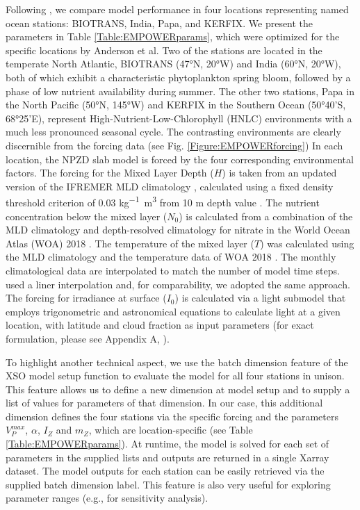 \documentclass[gmd, manuscript]{copernicus}
\begin{document}
Following \citet{Anderson2015c}, we compare model performance in four locations representing named ocean stations: BIOTRANS, India, Papa, and KERFIX. We present the parameters in Table \ref{Table:EMPOWERparams}, which were optimized for the specific locations by Anderson et al. Two of the stations are located in the temperate North Atlantic, BIOTRANS (47°N, 20°W) and India (60°N, 20°W), both of which exhibit a characteristic phytoplankton spring bloom, followed by a phase of low nutrient availability during summer. The other two stations, Papa in the North Pacific (50°N, 145°W) and KERFIX in the Southern Ocean (50°40'S, 68°25'E), represent High-Nutrient-Low-Chlorophyll (HNLC) environments with a much less pronounced seasonal cycle. The contrasting environments are clearly discernible from the forcing data (see Fig. \ref{Figure:EMPOWERforcing})
In each location, the NPZD slab model is forced by the four corresponding environmental factors. 
The forcing for the Mixed Layer Depth ($H$) is taken from an updated version of the IFREMER MLD climatology \citep{DeBoyerMontegut2004}, calculated using a fixed density threshold criterion of 0.03 \unit{kg^{-1} m^3} from 10 m depth value \citep{DeBoyer2022}.
The nutrient concentration below the mixed layer ($N_0$) is calculated from a combination of the MLD climatology and depth-resolved climatology for nitrate in the World Ocean Atlas (WOA) 2018 \citep{Garcia2019WORLDSilicate}. The temperature of the mixed layer ($T$) was calculated using the MLD climatology and the temperature data of WOA 2018 \citep{Locarnini2019WorldTemperature}. The monthly climatological data are interpolated to match the number of model time steps. \citet{Anderson2015c} used a liner interpolation and, for comparability, we adopted the same approach.
The forcing for irradiance at surface ($I_{0}$) is calculated via a light submodel that employs trigonometric and astronomical equations to calculate light at a given location, with latitude and cloud fraction as input parameters (for exact formulation, please see Appendix A, \citet{Anderson2015c}).

To highlight another technical aspect, we use the batch dimension feature of the XSO model setup function to evaluate the model for all four stations in unison. This feature allows us to define a new dimension at model setup and to supply a list of values for parameters of that dimension. In our case, this additional dimension defines the four stations via the specific forcing and the parameters $V_P^{max}$, $\alpha$, $I_Z$ and $m_Z$, which are location-specific (see Table \ref{Table:EMPOWERparams}). At runtime, the model is solved for each set of parameters in the supplied lists and outputs are returned in a single Xarray dataset. The model outputs for each station can be easily retrieved via the supplied batch dimension label. This feature is also very useful for exploring parameter ranges (e.g., for sensitivity analysis).
\end{document}
